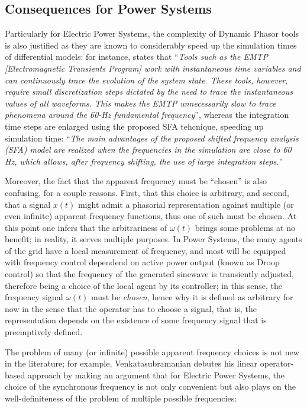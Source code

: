 \subsection{Consequences for Power Systems} %


	Particularly for Electric Power Systems, the complexity of Dynamic Phasor tools is also justified as they are known to considerably speed up the simulation times of differential models: for instance, \cite{laraRevisitingPowerSystems2024} states that ``\textit{Tools such as the EMTP [Electromagnetic Transients Program] work with instantaneous time variables and can continuously trace the evolution of the system state. These tools, however, require small discretization steps dictated by the need to trace the instantaneous values of all waveforms. This makes the EMTP unnecessarily slow to trace phenomena around the 60-Hz fundamental frequency}'', whereas the integration time steps are enlarged using the proposed SFA tehcnique, speeding up simulation time: ``\textit{The main advantages of the proposed shifted frequency analysis (SFA) model are realized when the frequencies in the simulation are close to 60 Hz, which allows, after frequency shifting, the use of large integration steps.}''

	Moreover, the fact that the apparent frequency must be ``chosen'' is also confusing, for a couple reasons. First, that this choice is arbitrary, and second, that a signal $x(t)$ might admit a phasorial representation against multiple (or even infinite) apparent frequency functions, thus one of such must be chosen. At this point one infers that the arbitrariness of $\omega(t)$ brings some problems at no benefit; in reality, it serves multiple purposes. In Power Systems, the many agents of the grid have a local measurement of frequency, and most will be equipped with frequency control dependend on active power output (known as Droop control) so that the frequency of the generated sinewave is transiently adjusted, therefore being a choice of the local agent by its controller; in this sense, the frequency signal $\omega(t)$ must be \textit{chosen}, hence why it is defined as arbitrary for now in the sense that the operator has to choose a signal, that is, the representation depends on the existence of some frequency signal that is preemptively defined.

	The problem of many (or infinite) possible apparent frequency choices is not new in the literature; for example, Venkatasubramanian debutes his linear operator-based approach by making an argument that for Electric Power Systems, the choice of the synchronous frequency is not only convenient but also plays on the well-definiteness of the problem of multiple possible frequencies:

